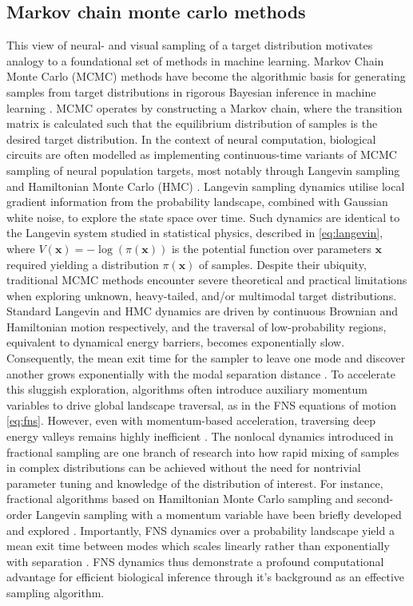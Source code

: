 \subsection{Markov chain monte carlo methods}\label{subsec:MCMC}
This view of neural- and visual sampling of a target distribution motivates analogy to a foundational set of methods in machine learning. Markov Chain Monte Carlo (MCMC) methods have become the algorithmic basis for generating samples from target distributions in rigorous Bayesian inference in machine learning \cite{cranmer_advances_2023, latuszynski_mcmc_2025, speagle_conceptual_2020, andrieu_particle_2010}. MCMC operates by constructing a Markov chain, where the transition matrix is calculated such that the equilibrium distribution of samples is the desired target distribution. In the context of neural computation, biological circuits are often modelled as implementing continuous-time variants of MCMC sampling of neural population targets, most notably through Langevin sampling and Hamiltonian Monte Carlo (HMC) \cite{latuszynski_mcmc_2025, betancourt_conceptual_2018}. Langevin sampling dynamics utilise local gradient information from the probability landscape, combined with Gaussian white noise, to explore the state space over time. Such dynamics are identical to the Langevin system studied in statistical physics, described in \cref{eq:langevin}, where $V(\textbf{x}) = - \log(\pi(\textbf{x}))$ is the potential function over parameters $\textbf{x}$ required yielding a distribution $\pi(\textbf{x})$ of samples. Despite their ubiquity, traditional MCMC methods encounter severe theoretical and practical limitations when exploring unknown, heavy-tailed, and/or multimodal target distributions. Standard Langevin and HMC dynamics are driven by continuous Brownian and Hamiltonian motion respectively, and the traversal of low-probability regions, equivalent to dynamical energy barriers, becomes exponentially slow. Consequently, the mean exit time for the sampler to leave one mode and discover another grows exponentially with the modal separation distance \cite{latuszynski_mcmc_2025}. To accelerate this sluggish exploration, algorithms often introduce auxiliary momentum variables to drive global landscape traversal, as in the FNS equations of motion \ref{eq:fns}. However, even with momentum-based acceleration, traversing deep energy valleys remains highly inefficient \cite{latuszynski_mcmc_2025, neal_sampling_1996, betancourt_conceptual_2018}. The nonlocal dynamics introduced in fractional sampling are one branch of research into how rapid mixing of samples in complex distributions can be achieved without the need for nontrivial parameter tuning and knowledge of the distribution of interest. For instance, fractional algorithms based on Hamiltonian Monte Carlo sampling and second-order Langevin sampling with a momentum variable have been briefly developed and explored \cite{simsekli_fractional_nodate, ijcai2018p419, qi_fractional_2022}. Importantly, FNS dynamics over a probability landscape yield a mean exit time between modes which scales linearly rather than exponentially with separation \cite{qi_fractional_2022}. FNS dynamics thus demonstrate a profound computational advantage for efficient biological inference through it's background as an effective sampling algorithm.